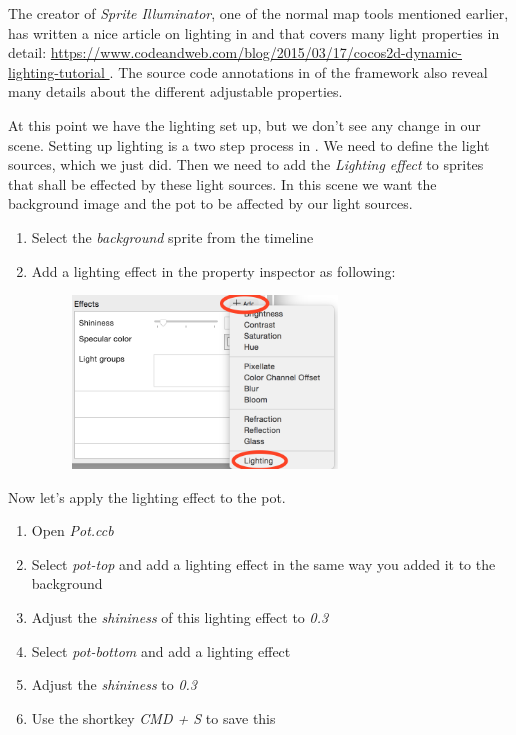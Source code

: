 \begin{details}
The creator of \textit{Sprite Illuminator}, one of the normal map tools
mentioned earlier, has written a nice article on lighting in \SB{} and \cocos{}
that covers many light properties in detail: \url{https://www.codeandweb.com/blog/2015/03/17/cocos2d-dynamic-lighting-tutorial
}. The source code annotations in  of the \cocos{}
framework also reveal many details about the different adjustable properties.
\end{details}

At this point we have the lighting set up, but we don't see any change in our
scene. Setting up lighting is a two step process in \cocos{}. We need to define
the light sources, which we just did. Then we need to add the \textit{Lighting
effect} to sprites that shall be effected by these light sources. In this scene
we want the background image and the pot to be
affected by our light sources.

\begin{leftbar}
\begin{enumerate}
  \item Select the \textit{background} sprite from the timeline
  \item Add a lighting effect in the property inspector as following: 
  \begin{figure}[H]
    \centering
    \includegraphics[width=200pt]{images/Chapter9/add_lighting_effect.png}
  \end{figure}
\end{enumerate}
\end{leftbar}

Now let's apply the lighting effect to the pot.
\begin{leftbar}
\begin{enumerate}
\item Open \textit{Pot.ccb}
  \item Select \textit{pot-top} and add a lighting effect in the same way you
  added it to the background
  \item Adjust the \textit{shininess} of this lighting effect to \textit{0.3}
  \item Select \textit{pot-bottom} and add a lighting effect
  \item Adjust the \textit{shininess} to \textit{0.3} 
  \item Use the shortkey \textit{CMD + S} to save this \ccbfile{}
\end{enumerate}
\end{leftbar}


